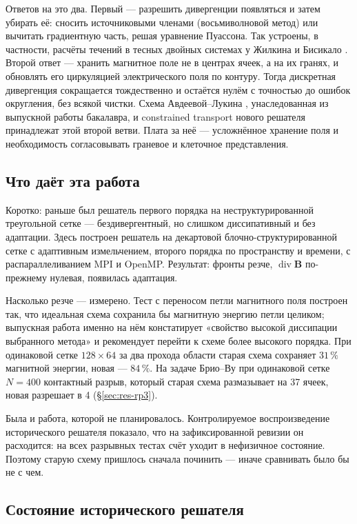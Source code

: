 \documentclass[12pt,a4paper]{article}
\newcommand{\divg}{\operatorname{div}}
\newcommand{\B}{\mathbf{B}}
\begin{document}
Ответов на это два. Первый — разрешить дивергенции появляться и затем убирать
её: сносить источниковыми членами (восьмиволновой метод) или вычитать
градиентную часть, решая уравнение Пуассона. Так устроены, в частности, расчёты
течений в тесных двойных системах у Жилкина и Бисикало \cite{zhilkin2010}. Второй
ответ — хранить магнитное поле не в центрах ячеек, а на их гранях, и обновлять
его циркуляцией электрического поля по контуру. Тогда дискретная дивергенция
сокращается тождественно и остаётся нулём с точностью до ошибок округления, без
всякой чистки. Схема Авдеевой--Лукина \cite{avdeeva2019,galanin2007},
унаследованная из выпускной работы бакалавра, и constrained transport нового
решателя принадлежат этой второй ветви. Плата за неё — усложнённое хранение
поля и необходимость согласовывать граневое и клеточное представления.

\subsection{Что даёт эта работа}

Коротко: раньше был решатель первого порядка на неструктурированной треугольной
сетке — бездивергентный, но слишком диссипативный и без адаптации. Здесь
построен решатель на декартовой блочно-структурированной сетке с адаптивным
измельчением, второго порядка по пространству и времени, с распараллеливанием
MPI и OpenMP. Результат: фронты резче, $\divg\B$ по-прежнему нулевая, появилась
адаптация.

Насколько резче — измерено. Тест с переносом петли магнитного поля построен так,
что идеальная схема сохранила бы магнитную энергию петли целиком; выпускная
работа именно на нём констатирует «свойство высокой диссипации выбранного
метода» и рекомендует перейти к схеме более высокого порядка. При одинаковой
сетке $128\times64$ за два прохода области старая схема сохраняет $31\,\%$
магнитной энергии, новая — $84\,\%$. На задаче Брио--Ву при одинаковой сетке
$N=400$ контактный разрыв, который старая схема размазывает на 37 ячеек, новая
разрешает в 4 (\S\ref{sec:res-rp3}).

Была и работа, которой не планировалось. Контролируемое воспроизведение
исторического решателя показало, что на зафиксированной ревизии он расходится:
на всех разрывных тестах счёт уходит в нефизичное состояние. Поэтому старую
схему пришлось сначала починить — иначе сравнивать было бы не с чем.

\subsection{Состояние исторического решателя}
\end{document}
